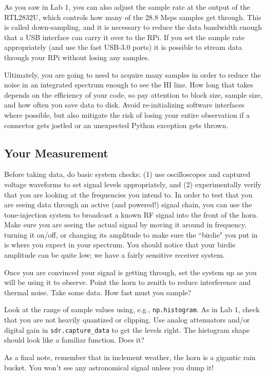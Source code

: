 \documentclass[11pt,preprint]{aastex}
\begin{document}
As you saw in Lab 1, you can also adjust the
sample rate at the output of the RTL2832U, which controls how many of
the 28.8 Msps samples get through. This is called down-sampling, and
it is necessary to reduce the data bandwidth enough that a
USB interface can carry it over to the RPi. If you set the sample
rate appropriately (and use the fast USB-3.0 ports)
it is possible to stream data through your RPi without losing any samples.

Ultimately, you are going to need to acquire many samples in order
to reduce the noise in an integrated spectrum enough to see
the HI line. How long that takes depends on the efficiency
of your code, so pay attention to block size, sample size,
and how often you save data to disk. Avoid re-initializing software 
interfaces where possible, but also mitigate the risk of losing your
entire observation if a connector gets jostled or an unexpected Python
exception gets thrown.

\subsection{Your Measurement}

\noindent
Before taking data, do basic system
checks: (1) use oscilloscopes and captured voltage waveforms to
set signal levels appropriately, and (2) experimentally
verify that you are looking at the frequencies you intend to. In order
to test that you are seeing data through an active (and powered!) signal
chain, you can use the tone-injection system to broadcast a known
RF signal into the front of the horn. 
Make sure you are seeing the actual signal by moving
it around in frequency, turning it on/off, or changing its amplitude
to make sure the ``birdie" you put in is where you expect in
your spectrum.  You should notice that your birdie amplitude can be quite low;
we have a fairly sensitive receiver system.

Once you are convinced your signal is getting through,
set the system up as you will be using it to observe. Point the
 horn to zenith to reduce interference and thermal noise.  Take some
data.  How fast must you sample? 

Look at the range of sample values using, e.g.,
  {\tt np.histogram}.  As in Lab 1, check that you are not heavily 
quantized or clipping.  Use analog attenuators and/or 
digital gain in {\tt sdr.capture\_data} to get the levels right.
  The histogram shape should look like a familiar function. Does it?

As a final note, remember that in inclement weather, the horn is a gigantic rain bucket. 
You won't see any astronomical signal unless you dump it!
\end{document}
